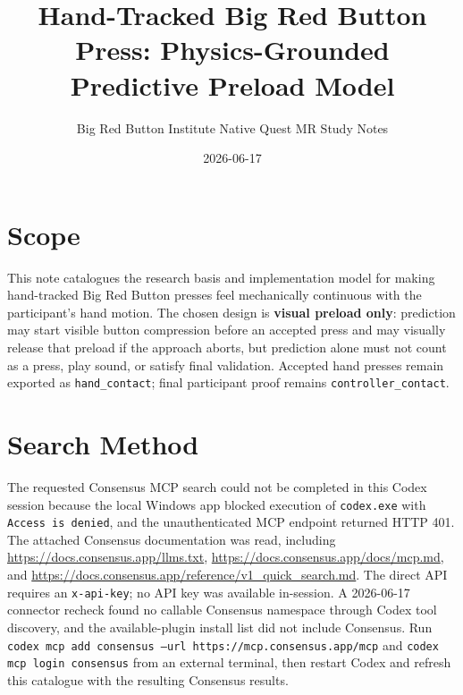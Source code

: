 \documentclass[11pt]{article}
\title{Hand-Tracked Big Red Button Press: Physics-Grounded Predictive Preload Model}
\author{Big Red Button Institute Native Quest MR Study Notes}
\date{2026-06-17}
\begin{document}
\maketitle

\section{Scope}
This note catalogues the research basis and implementation model for making hand-tracked Big Red Button presses feel mechanically continuous with the participant's hand motion. The chosen design is \textbf{visual preload only}: prediction may start visible button compression before an accepted press and may visually release that preload if the approach aborts, but prediction alone must not count as a press, play sound, or satisfy final validation. Accepted hand presses remain exported as \texttt{hand\_contact}; final participant proof remains \texttt{controller\_contact}.

\section{Search Method}
The requested Consensus MCP search could not be completed in this Codex session because the local Windows app blocked execution of \texttt{codex.exe} with \texttt{Access is denied}, and the unauthenticated MCP endpoint returned HTTP 401. The attached Consensus documentation was read, including \url{https://docs.consensus.app/llms.txt}, \url{https://docs.consensus.app/docs/mcp.md}, and \url{https://docs.consensus.app/reference/v1_quick_search.md}. The direct API requires an \texttt{x-api-key}; no API key was available in-session. A 2026-06-17 connector recheck found no callable Consensus namespace through Codex tool discovery, and the available-plugin install list did not include Consensus. Run \texttt{codex mcp add consensus --url https://mcp.consensus.app/mcp} and \texttt{codex mcp login consensus} from an external terminal, then restart Codex and refresh this catalogue with the resulting Consensus results.
\end{document}
